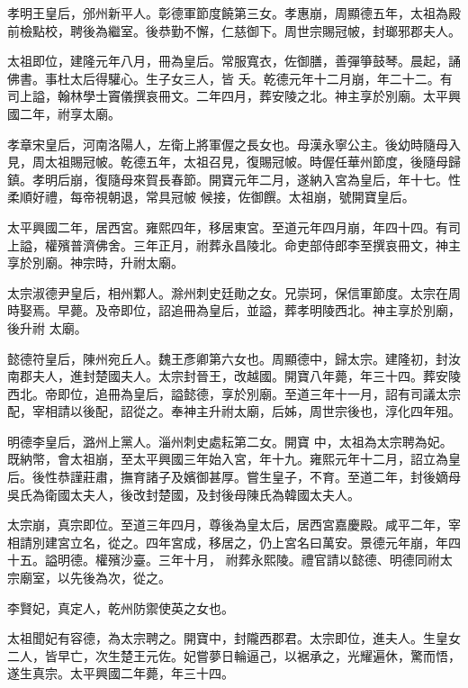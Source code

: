 \begin{pinyinscope}
 孝明王皇后，邠州新平人。彰德軍節度饒第三女。孝惠崩，周顯德五年，太祖為殿前檢點校，聘後為繼室。後恭勤不懈，仁慈御下。周世宗賜冠帔，封瑯邪郡夫人。



 太祖即位，建隆元年八月，冊為皇后。常服寬衣，佐御膳，善彈箏鼓琴。晨起，誦佛書。事杜太后得驩心。生子女三人，皆
 夭。乾德元年十二月崩，年二十二。有司上謚，翰林學士竇儀撰哀冊文。二年四月，葬安陵之北。神主享於別廟。太平興國二年，祔享太廟。



 孝章宋皇后，河南洛陽人，左衛上將軍偓之長女也。母漢永寧公主。後幼時隨母入見，周太祖賜冠帔。乾德五年，太祖召見，復賜冠帔。時偓任華州節度，後隨母歸鎮。孝明后崩，復隨母來賀長春節。開寶元年二月，遂納入宮為皇后，年十七。性柔順好禮，每帝視朝退，常具冠帔
 候接，佐御饌。太祖崩，號開寶皇后。



 太平興國二年，居西宮。雍熙四年，移居東宮。至道元年四月崩，年四十四。有司上謚，權殯普濟佛舍。三年正月，祔葬永昌陵北。命吏部侍郎李至撰哀冊文，神主享於別廟。神宗時，升祔太廟。



 太宗淑德尹皇后，相州鄴人。滁州刺史廷勛之女。兄崇珂，保信軍節度。太宗在周時娶焉。早薨。及帝即位，詔追冊為皇后，並謚，葬孝明陵西北。神主享於別廟，後升祔
 太廟。



 懿德符皇后，陳州宛丘人。魏王彥卿第六女也。周顯德中，歸太宗。建隆初，封汝南郡夫人，進封楚國夫人。太宗封晉王，改越國。開寶八年薨，年三十四。葬安陵西北。帝即位，追冊為皇后，謚懿德，享於別廟。至道三年十一月，詔有司議太宗配，宰相請以後配，詔從之。奉神主升祔太廟，后姊，周世宗後也，淳化四年殂。



 明德李皇后，潞州上黨人。淄州刺史處耘第二女。開寶
 中，太祖為太宗聘為妃。既納幣，會太祖崩，至太平興國三年始入宮，年十九。雍熙元年十二月，詔立為皇后。後性恭謹莊肅，撫育諸子及嬪御甚厚。嘗生皇子，不育。至道二年，封後嫡母吳氏為衛國太夫人，後改封楚國，及封後母陳氏為韓國太夫人。



 太宗崩，真宗即位。至道三年四月，尊後為皇太后，居西宮嘉慶殿。咸平二年，宰相請別建宮立名，從之。四年宮成，移居之，仍上宮名曰萬安。景德元年崩，年四十五。謚明德。權殯沙臺。三年十月，
 祔葬永熙陵。禮官請以懿德、明德同祔太宗廟室，以先後為次，從之。



 李賢妃，真定人，乾州防禦使英之女也。



 太祖聞妃有容德，為太宗聘之。開寶中，封隴西郡君。太宗即位，進夫人。生皇女二人，皆早亡，次生楚王元佐。妃嘗夢日輪逼己，以裾承之，光耀遍休，驚而悟，遂生真宗。太平興國二年薨，年三十四。




\end{pinyinscope}
